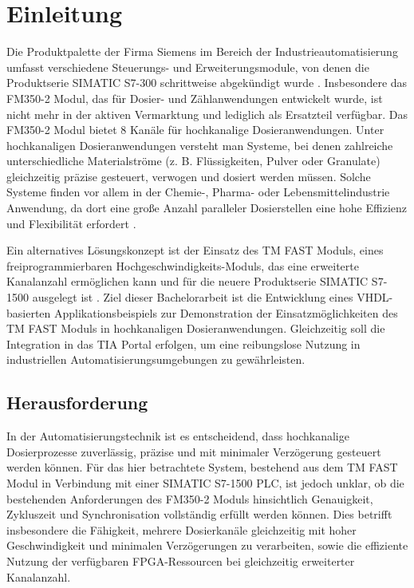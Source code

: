 \chapter{Einleitung} 

Die Produktpalette der Firma Siemens im Bereich der Industrieautomatisierung umfasst verschiedene Steuerungs- und Erweiterungsmodule, 
von denen die Produktserie SIMATIC S7-300 schrittweise abgekündigt wurde \cite{siemens_S7_300}. Insbesondere das FM350-2 Modul, das für 
Dosier- und Zählanwendungen entwickelt wurde, ist nicht mehr in der aktiven Vermarktung und lediglich als Ersatzteil verfügbar. 
Das FM350-2 Modul bietet 8 Kanäle für hochkanalige Dosieranwendungen. Unter hochkanaligen Dosieranwendungen versteht man Systeme, 
bei denen zahlreiche unterschiedliche Materialströme (z. B. Flüssigkeiten, Pulver oder Granulate) gleichzeitig präzise gesteuert, verwogen 
und dosiert werden müssen. Solche Systeme finden vor allem in der Chemie-, Pharma- oder Lebensmittelindustrie Anwendung, da dort eine 
große Anzahl paralleler Dosierstellen eine hohe Effizienz und Flexibilität erfordert \cite{chemart}.

Ein alternatives Lösungskonzept ist der Einsatz des TM FAST Moduls, eines freiprogrammierbaren Hochgeschwindigkeits-Moduls, das eine 
erweiterte Kanalanzahl ermöglichen kann und für die neuere Produktserie SIMATIC S7-1500 ausgelegt ist \cite{TmFast_progrmming_manual}. 
Ziel dieser Bachelorarbeit ist die Entwicklung eines VHDL-basierten Applikationsbeispiels zur Demonstration der Einsatzmöglichkeiten des 
TM FAST Moduls in hochkanaligen Dosieranwendungen. Gleichzeitig soll die Integration in das TIA Portal erfolgen, um eine reibungslose 
Nutzung in industriellen Automatisierungsumgebungen zu gewährleisten. 

\section{Herausforderung}

In der Automatisierungstechnik ist es entscheidend, dass hochkanalige Dosierprozesse zuverlässig, präzise und mit minimaler Verzögerung 
gesteuert werden können. Für das hier betrachtete System, bestehend aus dem TM FAST Modul in Verbindung mit einer SIMATIC S7-1500 PLC, 
ist jedoch unklar, ob die bestehenden Anforderungen des FM350-2 Moduls hinsichtlich Genauigkeit, Zykluszeit und Synchronisation vollständig 
erfüllt werden können. Dies betrifft insbesondere die Fähigkeit, mehrere Dosierkanäle gleichzeitig mit hoher Geschwindigkeit und minimalen 
Verzögerungen zu verarbeiten, sowie die effiziente Nutzung der verfügbaren FPGA-Ressourcen bei gleichzeitig erweiterter Kanalanzahl.

